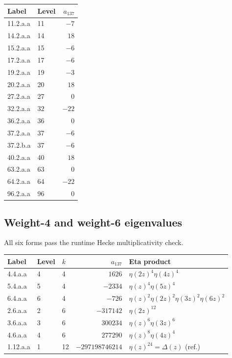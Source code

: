 \documentclass[12pt,a4paper]{article}
\begin{document}
\begin{center}
\begin{tabular}{llr}
\toprule
Label & Level & $a_{137}$ \\
\midrule
11.2.a.a  & 11  & $-7$  \\
14.2.a.a  & 14  & $18$  \\
15.2.a.a  & 15  & $-6$  \\
17.2.a.a  & 17  & $-6$  \\
19.2.a.a  & 19  & $-3$  \\
20.2.a.a  & 20  & $18$  \\
27.2.a.a  & 27  & $0$   \\
32.2.a.a  & 32  & $-22$ \\
36.2.a.a  & 36  & $0$   \\
37.2.a.a  & 37  & $-6$  \\
37.2.b.a  & 37  & $-6$  \\
40.2.a.a  & 40  & $18$  \\
63.2.a.a  & 63  & $0$   \\
64.2.a.a  & 64  & $-22$ \\
96.2.a.a  & 96  & $0$   \\
\bottomrule
\end{tabular}
\end{center}

\subsection{Weight-4 and weight-6 eigenvalues}

All six forms pass the runtime Hecke multiplicativity check.

\begin{center}
\begin{tabular}{lllrl}
\toprule
Label & Level & $k$ & $a_{137}$ & Eta product \\
\midrule
4.4.a.a   & 4 & 4 & $1626$    & $\eta(2z)^4\eta(4z)^4$ \\
5.4.a.a   & 5 & 4 & $-2334$   & $\eta(z)^4\eta(5z)^4$ \\
6.4.a.a   & 6 & 4 & $-726$    & $\eta(z)^2\eta(2z)^2\eta(3z)^2\eta(6z)^2$ \\
\midrule
2.6.a.a   & 2 & 6 & $-317142$ & $\eta(2z)^{12}$ \\
3.6.a.a   & 3 & 6 & $300234$  & $\eta(z)^6\eta(3z)^6$ \\
4.6.a.a   & 4 & 6 & $277290$  & $\eta(z)^8\eta(4z)^4$ \\
\midrule
1.12.a.a  & 1 & 12 & $-297198746214$ & $\eta(z)^{24}=\Delta(z)$ (ref.)\\
\bottomrule
\end{tabular}
\end{center}
\end{document}
